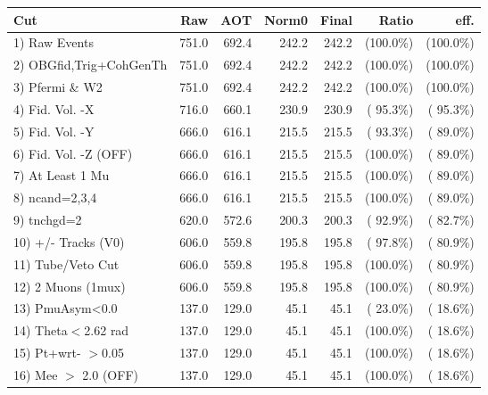  \begin{table}[h!]\centering
 \begin{tabular}{||l||r|r|r|r|r|r||}
 \hline
 \hline
 Cut & Raw & AOT & Norm0 & Final & Ratio & eff.       \\
 \hline
  1) Raw Events           &        751.0 &        692.4 &        242.2 &        242.2 & (100.0\%) & (100.0\%) \\
  2) OBGfid,Trig+CohGenTh &        751.0 &        692.4 &        242.2 &        242.2 & (100.0\%) & (100.0\%) \\
  3) Pfermi \& W2         &        751.0 &        692.4 &        242.2 &        242.2 & (100.0\%) & (100.0\%) \\
  4) Fid. Vol. -X         &        716.0 &        660.1 &        230.9 &        230.9 & ( 95.3\%) & ( 95.3\%) \\
  5) Fid. Vol. -Y         &        666.0 &        616.1 &        215.5 &        215.5 & ( 93.3\%) & ( 89.0\%) \\
  6) Fid. Vol. -Z (OFF)   &        666.0 &        616.1 &        215.5 &        215.5 & (100.0\%) & ( 89.0\%) \\
  7) At Least 1 Mu        &        666.0 &        616.1 &        215.5 &        215.5 & (100.0\%) & ( 89.0\%) \\
  8) ncand=2,3,4          &        666.0 &        616.1 &        215.5 &        215.5 & (100.0\%) & ( 89.0\%) \\
  9) tnchgd=2             &        620.0 &        572.6 &        200.3 &        200.3 & ( 92.9\%) & ( 82.7\%) \\
 10) +/- Tracks (V0)      &        606.0 &        559.8 &        195.8 &        195.8 & ( 97.8\%) & ( 80.9\%) \\
 11) Tube/Veto Cut        &        606.0 &        559.8 &        195.8 &        195.8 & (100.0\%) & ( 80.9\%) \\
 12) 2 Muons (1mux)       &        606.0 &        559.8 &        195.8 &        195.8 & (100.0\%) & ( 80.9\%) \\
 13) PmuAsym<0.0          &        137.0 &        129.0 &         45.1 &         45.1 & ( 23.0\%) & ( 18.6\%) \\
 14) Theta$<$2.62 rad     &        137.0 &        129.0 &         45.1 &         45.1 & (100.0\%) & ( 18.6\%) \\
 15) Pt+wrt- $>$0.05      &        137.0 &        129.0 &         45.1 &         45.1 & (100.0\%) & ( 18.6\%) \\
 16) Mee $>$ 2.0  (OFF)   &        137.0 &        129.0 &         45.1 &         45.1 & (100.0\%) & ( 18.6\%) \\

\end{tabular}
\end{table}
